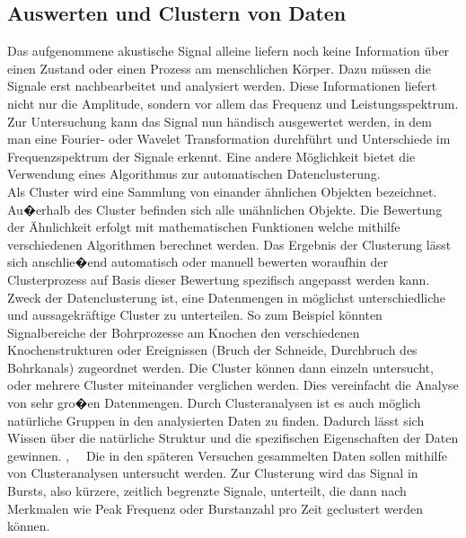 \documentclass[twoside, 12pt, a4paper]{article}
\begin{document}
	
	
 	\newpage
	
	
	\subsection{Auswerten und Clustern von Daten}
	
	Das aufgenommene akustische Signal alleine liefern noch keine Information \"uber einen Zustand oder einen Prozess am menschlichen K\"orper. Dazu m\"ussen die Signale erst nachbearbeitet und analysiert werden. Diese Informationen liefert nicht nur die Amplitude, sondern vor allem das Frequenz und Leistungsspektrum. Zur Untersuchung kann das Signal nun \grqq{}h\"andisch\grqq{} ausgewertet werden, in dem man eine Fourier- oder Wavelet Transformation durchf\"uhrt und Unterschiede im Frequenzspektrum der Signale erkennt. Eine andere M\"oglichkeit bietet die Verwendung eines Algorithmus zur automatischen Datenclusterung.\\
	Als Cluster wird eine Sammlung von einander \"ahnlichen Objekten bezeichnet. Au�erhalb des Cluster befinden sich alle un\"ahnlichen Objekte. Die Bewertung der \"Ahnlichkeit erfolgt mit mathematischen Funktionen welche mithilfe verschiedenen Algorithmen berechnet werden. Das Ergebnis der Clusterung l\"asst sich anschlie�end automatisch oder manuell bewerten woraufhin der Clusterprozess auf Basis dieser Bewertung spezifisch angepasst werden kann. Zweck der  Datenclusterung ist, eine Datenmengen in m\"oglichst unterschiedliche und aussagekr\"aftige Cluster zu  unterteilen. So zum Beispiel k\"onnten Signalbereiche der Bohrprozesse am Knochen den verschiedenen Knochenstrukturen oder Ereignissen (Bruch der Schneide, Durchbruch des Bohrkanals) zugeordnet werden. Die Cluster k\"onnen dann einzeln untersucht, oder mehrere Cluster miteinander verglichen werden. Dies vereinfacht die Analyse von sehr gro�en Datenmengen. Durch Clusteranalysen ist es auch m\"oglich nat\"urliche Gruppen in den analysierten Daten zu finden. Dadurch l\"asst sich Wissen \"uber die nat\"urliche Struktur und die spezifischen Eigenschaften der Daten gewinnen. \cite{CanOnder.15.01.2004},~\cite{PhilipPlohn.2014}~ Die in den sp\"ateren Versuchen gesammelten Daten sollen mithilfe von Clusteranalysen untersucht werden. Zur Clusterung wird das Signal in Bursts, also k\"urzere, zeitlich begrenzte Signale, unterteilt, die dann nach Merkmalen wie Peak Frequenz oder Burstanzahl pro Zeit geclustert werden k\"onnen. 
	
	
\end{document}

